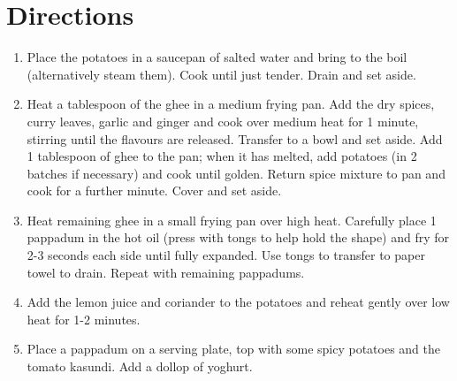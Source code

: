 \section*{Directions}
\begin{enumerate}
	\item Place the potatoes in a saucepan of salted water and bring to the boil (alternatively steam them). Cook until just tender. Drain and set aside.
	\item Heat a tablespoon of the ghee in a medium frying pan.
		Add the dry spices, curry leaves, garlic and ginger and cook over medium heat for 1 minute, stirring until the flavours are released.
		Transfer to a bowl and set aside. Add 1 tablespoon of ghee to the pan; when it has melted, add potatoes (in 2 batches if necessary) and cook until golden.
		Return spice mixture to pan and cook for a further minute. Cover and set aside.
	\item Heat remaining ghee in a small frying pan over high heat.
		Carefully place 1 pappadum in the hot oil (press with tongs to help hold the shape) and fry for 2-3 seconds each side until fully expanded.
		Use tongs to transfer to paper towel to drain. Repeat with remaining pappadums.
	\item Add the lemon juice and coriander to the potatoes and reheat gently over low heat for 1-2 minutes.
	\item Place a pappadum on a serving plate, top with some spicy potatoes and the tomato kasundi. Add a dollop of yoghurt.
\end{enumerate}


\bigskip
